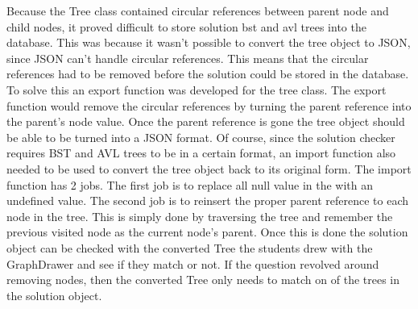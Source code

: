 \noindent
Because the Tree class contained circular references between parent node and child nodes, it proved difficult to store solution bst and avl trees into the database. This was because it wasn't possible to convert the tree object to JSON, since JSON can't handle circular references. This means that the circular references had to be removed before the solution could be stored in the database. To solve this an export function was developed for the tree class. The export function would remove the circular references by turning the parent reference into the parent's node value. Once the parent reference is gone the tree object should be able to be turned into a JSON format. Of course, since the solution checker requires BST and AVL trees to be in a certain format, an import function also needed to be used to convert the tree object back to its original form. The import function has 2 jobs. The first job is to replace all null value in the with an undefined value. The second job is to reinsert the proper parent reference to each node in the tree. This is simply done by traversing the tree and remember the previous visited node as the current node's parent. Once this is done the solution object can be checked with the converted Tree the students drew with the GraphDrawer and see if they match or not. If the question revolved around removing nodes, then the converted Tree only needs to match on of the trees in the solution object.

